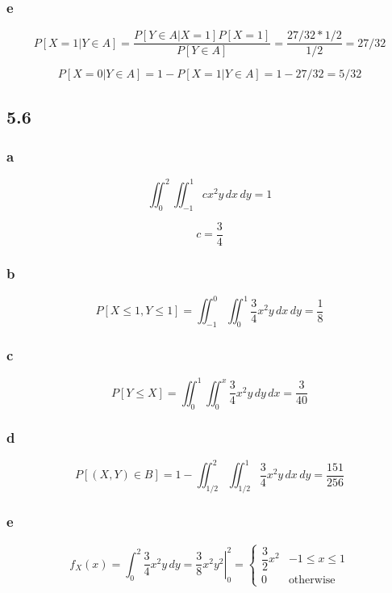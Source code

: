 \documentclass{article}
\begin{document}
\subsubsection*{e}

\[ P[X=1|Y \in A] = \frac{P[Y \in A | X=1]P[X=1]}{P[Y \in A]} = \frac{27/32 * 1/2}{1/2} = 27/32 \]

\[ P[X=0|Y \in A] = 1 - P[X=1|Y \in A] = 1 - 27/32 = 5/32 \]


\subsection*{5.6}

\subsubsection*{a}

\[ \iint_{0}^{2} \iint_{-1}^{1} c x^2 y \, dx \, dy = 1 \]

\[ c = \frac{3}{4}\]

\subsubsection*{b}

\[ P[X \leq 1, Y \leq 1] = \iint_{-1}^{0} \iint_{0}^{1} \frac{3}{4} x^2 y \, dx \, dy = \frac{1}{8}\]

\subsubsection*{c}

\[ P[Y \leq X] = \iint_{0}^{1} \iint_{0}^{x} \frac{3}{4} x^2 y \, dy \, dx = \frac{3}{40}\]

\subsubsection*{d}

\[ 
     P[(X,Y) \in B] = 1 - \iint_{1/2}^{2} \iint_{1/2}^{1} \frac{3}{4} x^2 y \, dx \, dy = \frac{151}{256} 
\]

\subsubsection*{e}

\[
	f_X(x) = \int_0^2 \frac{3}{4} x^2 y \, dy = \left.\frac{3}{8} x^2 y^2 \right|_0^2 =
	\begin{cases} \dfrac{3}{2} x^2 & -1 \leq x \leq 1 \\ 0 & \text{otherwise} \end{cases}
\]
\end{document}
